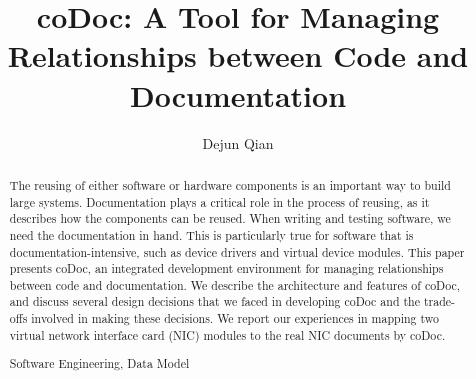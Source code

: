 \documentclass[runningheads,a4paper]{llncs}
\newcommand{\keywords}[1]{\par\addvspace\baselineskip
\noindent\keywordname\enspace\ignorespaces#1}
\begin{document}
\mainmatter  %

\title{coDoc: A Tool for Managing Relationships between Code and Documentation}


%
%
\author{Dejun Qian}
%


%
%

\maketitle


\begin{abstract}
The reusing of either software or hardware components is an important way to build large systems.
Documentation plays a critical role in the process of reusing,
as it describes how the components can be reused.
When writing and testing software, 
we need the documentation in hand.
This is particularly true for software that is documentation-intensive, 
such as device drivers and virtual device modules.
This paper presents coDoc, 
an integrated development environment for managing relationships between code and documentation.
We describe the architecture and features of coDoc,
and discuss several design decisions that we faced in developing coDoc and the trade-offs involved in making these decisions.
We report our experiences in mapping two virtual network interface card (NIC) modules to the real NIC documents by coDoc.
\keywords{Software Engineering, Data Model}
\end{abstract}
\end{document}
